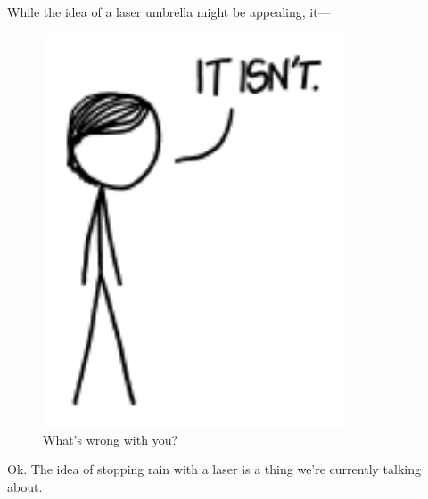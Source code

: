{{While the idea of a laser umbrella might be appealing, it—}

\begin{figure}[!htbp]
\centering
\includegraphics[scale=0.5, max width=0.8\textwidth]{imgs/a/119/no2.png}
\caption{What's wrong with you?}
\end{figure}

{Ok. The idea of stopping rain with a laser is a thing we're currently talking about.}

}
